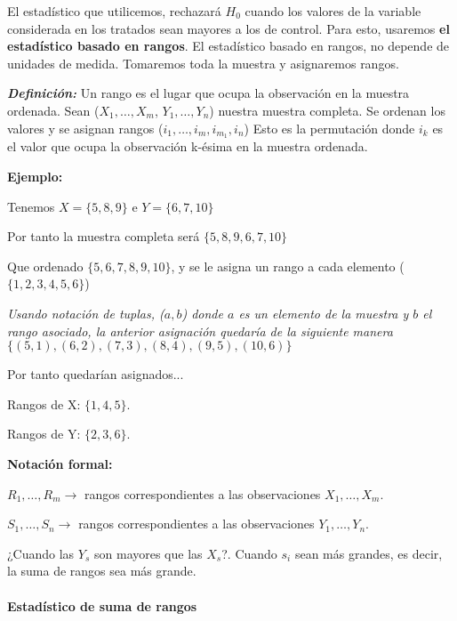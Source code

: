 El estadístico que utilicemos, rechazará $H_0$ cuando los valores de la variable considerada en los tratados sean mayores a los de control.
Para esto, usaremos \textbf{el estadístico basado en rangos}.
El estadístico basado en rangos, no depende de unidades de medida. Tomaremos toda la muestra y asignaremos rangos.

\textbf{\textit{Definición:}} Un rango es el lugar que ocupa la observación en la muestra ordenada.
Sean ($X_1,\dots,X_m$, $Y_1,\dots,Y_n$) nuestra muestra completa. Se ordenan los valores y se asignan rangos ($i_1,\dots,i_m,i_{m_1},i_n$)
Esto es la permutación donde $i_k$ es el valor que ocupa la observación k-ésima en la muestra ordenada.

\textbf{Ejemplo:}

Tenemos $X=\{5,8,9\}$ e $Y=\{6,7,10\}$

Por tanto la muestra completa será $\{5,8,9,6,7,10\}$

Que ordenado $\{5,6,7,8,9,10\}$, y se le asigna un rango a cada elemento ($\{1,2,3,4,5,6\}$)

\vspace{2mm}

\noindent \textit{Usando notación de tuplas, ($a, b$) donde $a$ es un elemento de la muestra y $b$ el rango asociado, la anterior asignación quedaría de la siguiente manera $\{(5, 1),(6, 2),(7, 3),(8, 4),(9, 5),(10, 6)\}$}

\vspace{2mm}

\noindent Por tanto quedarían asignados...

Rangos de X: $\{1,4,5\}$.

Rangos de Y: $\{2,3,6\}$.

\vspace{5mm}

\noindent \textbf{Notación formal:}

$R_1,\dots,R_m \longrightarrow$ rangos correspondientes a las observaciones $X_1,\dots,X_m$.

$S_1,\dots,S_n \longrightarrow$ rangos correspondientes a las observaciones $Y_1,\dots,Y_n$.

¿Cuando las $Y_s$ son mayores que las $X_s$?. Cuando $s_i$ sean más grandes, es decir, la suma de rangos sea más grande.

\paragraph{Estadístico de suma de rangos}

